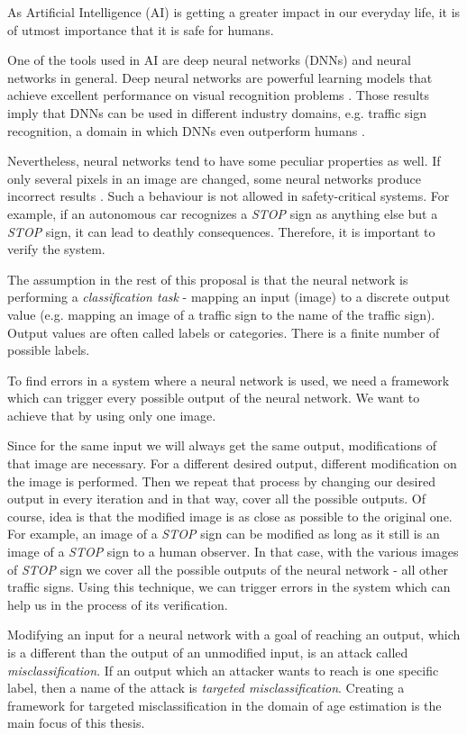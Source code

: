 As Artificial Intelligence (AI) is getting a greater impact in our everyday life, it is of utmost importance that it is safe for humans.  

One of the tools used in AI are deep neural networks (DNNs) and neural networks in general. Deep neural networks are powerful learning models that achieve excellent performance on visual recognition problems \cite{krizhevsky2012imagenet}. Those results imply that DNNs can be used in different industry domains, e.g. traffic sign recognition, a domain in which DNNs even outperform humans \cite{outperformhumans}. 

Nevertheless, neural networks tend to have some peculiar properties as well. If only several pixels in an image are changed, some neural networks produce incorrect results \cite{szegedy2013intriguing}. Such a behaviour is not allowed in safety-critical systems. For example, if an autonomous car recognizes a  \textit{STOP} sign as anything else but a \textit{STOP} sign, it can lead to deathly consequences. Therefore, it is important to verify the system. 

The assumption in the rest of this proposal is that the neural network is performing a \textit{classification task} - mapping an input (image) to a discrete output value (e.g. mapping an image of a traffic sign to the name of the traffic sign).  Output values are often called labels or categories. There is a finite number of possible labels.

To find errors in a system where a neural network is used, we need a framework which can trigger every possible output of the neural network.  We want to achieve that by using only one image. 

Since for the same input we will always get the same output, modifications of that image are necessary. For a different desired output, different modification on the image is performed.
Then we repeat that process by changing our desired output in every iteration and in that way, cover all the possible outputs. Of course, idea is that the modified image is as close as possible to the original one. For example, an image of a  \textit{STOP} sign can be modified as long as it still is an image of a  \textit{STOP} sign to a human observer. In that case, with the various images of  \textit{STOP} sign we cover all the possible outputs of the neural network - all other traffic signs. Using this technique, we can trigger errors in the system which can help us in the process of its verification. 

Modifying an input for a neural network with a goal of reaching an output, which is a different than the output of an unmodified input, is an attack called \textit{misclassification}. If an output which an attacker wants to reach is one specific label, then a name of the attack is \textit{targeted misclassification}. Creating a framework for targeted misclassification in the domain of age estimation is the main focus of this thesis.